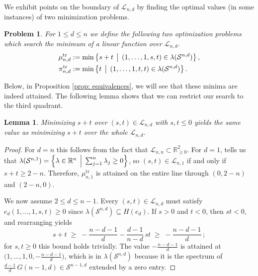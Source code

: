 \documentclass[reqno,hidelinks,11pt]{amsart}
\numberwithin{equation}{section}
\newtheorem{lemma}[theorem]{Lemma}
\newtheorem{problem}[theorem]{Problem}
\def\RR{\mathbb{R}}
\def\S{\mathcal{S}}
\newcommand{\suchthat}{\;\ifnum\currentgrouptype=16 \middle\fi|\;}
\begin{document}
We exhibit points on the boundary of $\mathcal{L}_{n,d}$ by finding the optimal values (in some instances) of two minimization problems.

\begin{problem}\label{problem:min} For $1 \leq d \leq n$ we define the following two optimization problems which search the minimum of a linear function over $\mathcal{L}_{n,d}$.
    \begin{align*}
        \mu_{n,d}^{\operatorname{tr}} & :=   \min\left\{s+t\,\suchthat\, (1,\dots,1,s,t)\in\lambda(\mathcal{S}^{n,d})\right\}, \\
        \pi_{n,d}^{\operatorname{tr}} & :=   \min\left\{t\,\suchthat\, (1,\dots,1,t,t)\in\lambda(\mathcal{S}^{n,d})\right\}.        
    \end{align*}
\end{problem}
Below, in Proposition \ref{prop: equivalences}, we will see that these minima are indeed attained. The following lemma shows that we can restrict our search to the third quadrant.

\begin{lemma}\label{lem: s,t <= 0}
Minimizing $s+t$ over $(s,t) \in \mathcal{L}_{n,d}$ with $s,t\leq 0$ yields the same value as minimizing $s+t$ over the whole $\mathcal{L}_{n,d}$. 
\end{lemma}

\begin{proof}
For $d=n$ this follows from the fact that $\mathcal{L}_{n,n} \subset \RR^2_{\geq 0}$. 
For $d=1$, \cite[Proposition~1.1]{kozhasov2023eigenvalues} tells us that $\lambda(\S^{n,1})=\left\{ \lambda \in \RR^n \, \suchthat \, \sum_{j=1}^n \lambda_j \geq 0 \right\}$, so $(s,t) \in \mathcal{L}_{n,1}$ if and only if $s + t \geq 2-n$. Therefore, $\mu_{n,1}^{\operatorname{tr}}$ is attained on the entire line through $(0,2-n)$ and $(2-n,0)$. 

We now assume $2 \leq d \leq n - 1$. Every
$(s,t) \in \mathcal{L}_{n,d}$ must satisfy $e_d(1,\dots,1,s,t) \ge 0$ since $\lambda(\mathcal{S}^{n,d}) \subseteq H(e_d)$.
If $s > 0$ and $t < 0$, then $st < 0$, and rearranging yields
\[
s + t \;\ge\; -\frac{n-d-1}{d} - \frac{d-1}{n-d}\, st
\;\ge\; -\frac{n-d-1}{d}\,;
\]
for $s,t \ge 0$ this bound holds trivially. The value
$-\frac{n-d-1}{d}$ is attained at
$\bigl(1,\dots,1,0,-\frac{n-d-1}{d}\bigr)$, which is in $\lambda(\S^{n, d})$ because it is the spectrum of $\frac{d-1}{d}\,G(n-1,d) \in \mathcal{S}^{n-1,d}$
extended by a zero entry. 
\end{proof}
\end{document}
